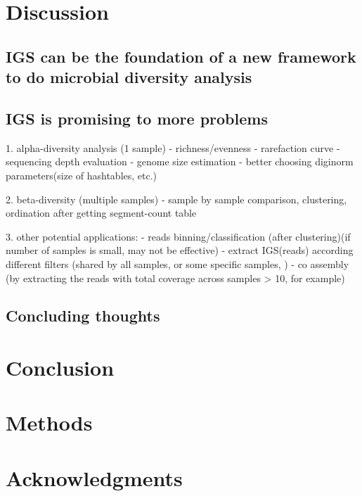 \documentclass{article}
\begin{document}








\section{Discussion}

\subsection{IGS can be the foundation of a new framework to do microbial diversity analysis}


\subsection{IGS is promising to more problems}

1. alpha-diversity analysis (1 sample)
    - richness/evenness
    - rarefaction curve
    - sequencing depth evaluation
    - genome size estimation
    - better choosing diginorm parameters(size of hashtables, etc.)

2. beta-diversity (multiple samples)
    - sample by sample comparison, clustering, ordination after getting segment-count table

3. other potential applications:
    - reads binning/classification (after clustering)(if number of samples is small, may not be effective)
    - extract IGS(reads) according different filters (shared by all samples, or some specific samples, )
    - co assembly (by extracting the reads with total coverage across samples > 10, for example)
    
    

\subsection{Concluding thoughts}



\section{Conclusion}

\section{Methods}

\section{Acknowledgments}
\end{document}
